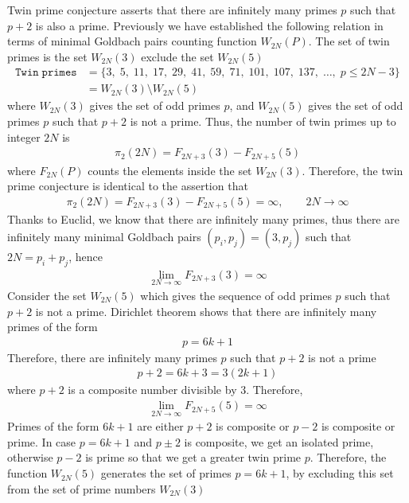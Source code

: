﻿Twin prime conjecture asserts that there are infinitely many primes $p$ such that $p+2$ is also a prime.
Previously we have established the following relation in terms of minimal Goldbach pairs counting function
$W_{2N}(P)$.
The set of twin primes is the set $W_{2N}(3)$ exclude the set $W_{2N}(5)$
\begin{align*}
    \mathtt{Twin \; primes} &= \{ 3, \; 5, \; 11, \; 17, \; 29, \; 41, \; 59, \; 71, \; 101, \; 107, \; 137, \; \dots, \;  p \leq 2N - 3 \} \\
    &= W_{2N}(3) \setminus W_{2N}(5)
\end{align*}
where $W_{2N}(3)$ gives the set of odd primes $p$, and $W_{2N}(5)$ gives the set of odd primes $p$ such that $p+2$
is not a prime.
Thus, the number of twin primes up to integer $2N$ is
\begin{align*}
    \pi_2 (2N) = F_{2N+3}(3) - F_{2N+5}(5)
\end{align*}
where $F_{2N}(P)$ counts the elements inside the set $W_{2N}(3)$.
Therefore, the twin prime conjecture is identical to the assertion that
\begin{align*}
    \pi_2 (2N) = F_{2N+3}(3) - F_{2N+5}(5) = \infty, \quad \quad 2N\to\infty
\end{align*}
Thanks to Euclid, we know that there are infinitely many primes, thus
there are infinitely many minimal Goldbach pairs $(p_i, p_j) = (3, p_j)$ such that $2N=p_i+p_j$,
hence
\begin{align*}
    \lim_{2N\to\infty} F_{2N+3}(3) = \infty
\end{align*}
Consider the set $W_{2N}(5)$ which gives the sequence of odd primes $p$ such that $p+2$ is not a prime.
Dirichlet theorem shows that there are infinitely many primes of the form
\begin{align*}
    p = 6k+1
\end{align*}
Therefore, there are infinitely many primes $p$ such that $p+2$ is not a prime
\begin{align*}
    p+2 = 6k+3 = 3(2k+1)
\end{align*}
where $p+2$ is a composite number divisible by 3.
Therefore,
\begin{align*}
    \lim_{2N\to\infty} F_{2N+5}(5) = \infty
\end{align*}
Primes of the form $6k+1$ are either $p+2$ is composite or $p-2$ is composite or prime.
In case $p=6k+1$ and $p \pm 2$ is composite, we get an isolated prime, otherwise $p-2$ is prime so that
we get a greater twin prime $p$.
Therefore, the function $W_{2N}(5)$ generates the set of primes $p=6k+1$, by excluding this set from the set of prime numbers $W_{2N}(3)$
